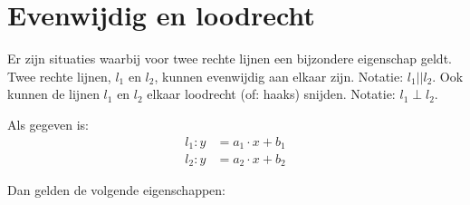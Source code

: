 \section{Evenwijdig en loodrecht}
Er zijn situaties waarbij voor twee rechte lijnen een bijzondere eigenschap geldt.
Twee rechte lijnen, $l_1$ en $l_2$, kunnen evenwijdig aan elkaar zijn. Notatie: $l_1 || l_2$.
Ook kunnen de lijnen $l_1$ en $l_2$ elkaar loodrecht (of: haaks) snijden. Notatie: $l_1 \perp l_2$.

Als gegeven is:	
\begin{align*}    
    l_1:y&=a_1\cdot x+b_1 \\
    l_2:y&=a_2\cdot x+b_2
\end{align*}

Dan gelden de volgende eigenschappen:

